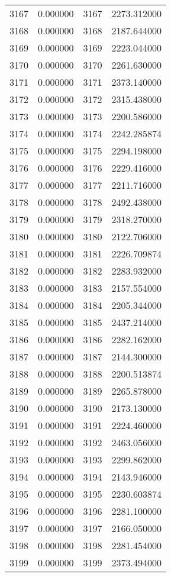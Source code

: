 \documentclass[12pt]{article}
\begin{document}
\begin{longtable}{@{}cccc@{}}
3167 & 0.000000 & 3167 & 2273.312000 \\
3168 & 0.000000 & 3168 & 2187.644000 \\
3169 & 0.000000 & 3169 & 2223.044000 \\
3170 & 0.000000 & 3170 & 2261.630000 \\
3171 & 0.000000 & 3171 & 2373.140000 \\
3172 & 0.000000 & 3172 & 2315.438000 \\
3173 & 0.000000 & 3173 & 2200.586000 \\
3174 & 0.000000 & 3174 & 2242.285874 \\
3175 & 0.000000 & 3175 & 2294.198000 \\
3176 & 0.000000 & 3176 & 2229.416000 \\
3177 & 0.000000 & 3177 & 2211.716000 \\
3178 & 0.000000 & 3178 & 2492.438000 \\
3179 & 0.000000 & 3179 & 2318.270000 \\
3180 & 0.000000 & 3180 & 2122.706000 \\
3181 & 0.000000 & 3181 & 2226.709874 \\
3182 & 0.000000 & 3182 & 2283.932000 \\
3183 & 0.000000 & 3183 & 2157.554000 \\
3184 & 0.000000 & 3184 & 2205.344000 \\
3185 & 0.000000 & 3185 & 2437.214000 \\
3186 & 0.000000 & 3186 & 2282.162000 \\
3187 & 0.000000 & 3187 & 2144.300000 \\
3188 & 0.000000 & 3188 & 2200.513874 \\
3189 & 0.000000 & 3189 & 2265.878000 \\
3190 & 0.000000 & 3190 & 2173.130000 \\
3191 & 0.000000 & 3191 & 2224.460000 \\
3192 & 0.000000 & 3192 & 2463.056000 \\
3193 & 0.000000 & 3193 & 2299.862000 \\
3194 & 0.000000 & 3194 & 2143.946000 \\
3195 & 0.000000 & 3195 & 2230.603874 \\
3196 & 0.000000 & 3196 & 2281.100000 \\
3197 & 0.000000 & 3197 & 2166.050000 \\
3198 & 0.000000 & 3198 & 2281.454000 \\
3199 & 0.000000 & 3199 & 2373.494000 \\

\end{longtable}
\end{document}
